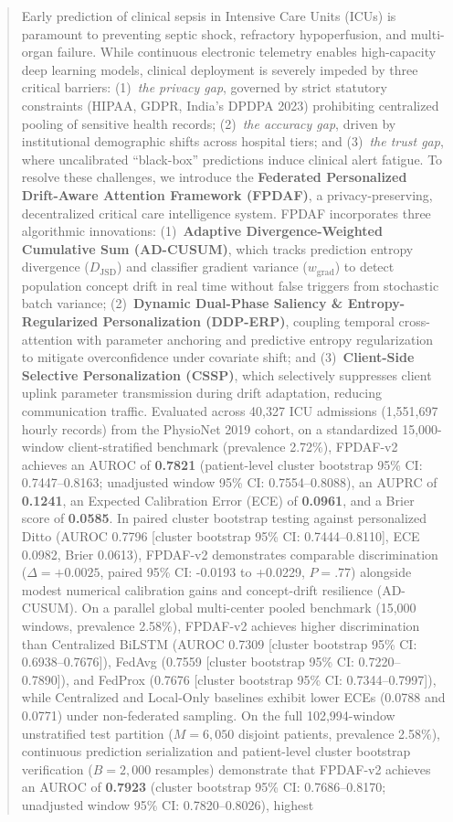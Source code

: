 \documentclass[journal,twocolumn,10pt]{IEEEtran}
\begin{document}
\begin{abstract}
Early prediction of clinical sepsis in Intensive Care Units (ICUs) is paramount to preventing septic shock, refractory hypoperfusion, and multi-organ failure. While continuous electronic telemetry enables high-capacity deep learning models, clinical deployment is severely impeded by three critical barriers: (1)~\textit{the privacy gap}, governed by strict statutory constraints (HIPAA, GDPR, India's DPDPA 2023) prohibiting centralized pooling of sensitive health records; (2)~\textit{the accuracy gap}, driven by institutional demographic shifts across hospital tiers; and (3)~\textit{the trust gap}, where uncalibrated ``black-box'' predictions induce clinical alert fatigue. To resolve these challenges, we introduce the \textbf{Federated Personalized Drift-Aware Attention Framework (FPDAF)}, a privacy-preserving, decentralized critical care intelligence system. FPDAF incorporates three algorithmic innovations: (1)~\textbf{Adaptive Divergence-Weighted Cumulative Sum (AD-CUSUM)}, which tracks prediction entropy divergence ($D_{\text{JSD}}$) and classifier gradient variance ($w_{\text{grad}}$) to detect population concept drift in real time without false triggers from stochastic batch variance; (2)~\textbf{Dynamic Dual-Phase Saliency \& Entropy-Regularized Personalization (DDP-ERP)}, coupling temporal cross-attention with parameter anchoring and predictive entropy regularization to mitigate overconfidence under covariate shift; and (3)~\textbf{Client-Side Selective Personalization (CSSP)}, which selectively suppresses client uplink parameter transmission during drift adaptation, reducing communication traffic. Evaluated across 40,327 ICU admissions (1,551,697 hourly records) from the PhysioNet 2019 cohort, on a standardized 15,000-window client-stratified benchmark (prevalence 2.72\%), FPDAF-v2 achieves an AUROC of \textbf{0.7821} (patient-level cluster bootstrap 95\% CI: 0.7447--0.8163; unadjusted window 95\% CI: 0.7554--0.8088), an AUPRC of \textbf{0.1241}, an Expected Calibration Error (ECE) of \textbf{0.0961}, and a Brier score of \textbf{0.0585}. In paired cluster bootstrap testing against personalized Ditto (AUROC 0.7796 [cluster bootstrap 95\% CI: 0.7444--0.8110], ECE 0.0982, Brier 0.0613), FPDAF-v2 demonstrates comparable discrimination ($\Delta = +0.0025$, paired 95\% CI: -0.0193 to +0.0229, $P = .77$) alongside modest numerical calibration gains and concept-drift resilience (AD-CUSUM). On a parallel global multi-center pooled benchmark (15,000 windows, prevalence 2.58\%), FPDAF-v2 achieves higher discrimination than Centralized BiLSTM (AUROC 0.7309 [cluster bootstrap 95\% CI: 0.6938--0.7676]), FedAvg (0.7559 [cluster bootstrap 95\% CI: 0.7220--0.7890]), and FedProx (0.7676 [cluster bootstrap 95\% CI: 0.7344--0.7997]), while Centralized and Local-Only baselines exhibit lower ECEs (0.0788 and 0.0771) under non-federated sampling. On the full 102,994-window unstratified test partition ($M=6,050$ disjoint patients, prevalence 2.58\%), continuous prediction serialization and patient-level cluster bootstrap verification ($B=2,000$ resamples) demonstrate that FPDAF-v2 achieves an AUROC of \textbf{0.7923} (cluster bootstrap 95\% CI: 0.7686--0.8170; unadjusted window 95\% CI: 0.7820--0.8026), highest 
\end{abstract}
\end{document}
